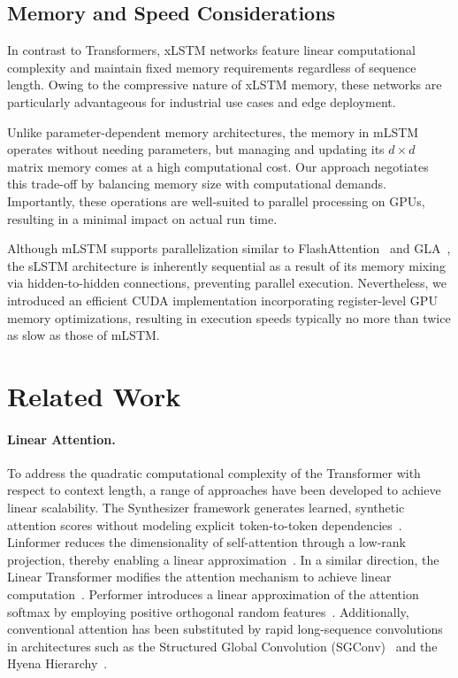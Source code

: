 \subsection{Memory and Speed Considerations}

In contrast to Transformers, xLSTM networks feature linear computational complexity and maintain fixed memory requirements regardless of sequence length. Owing to the compressive nature of xLSTM memory, these networks are particularly advantageous for industrial use cases and edge deployment.

Unlike parameter-dependent memory architectures, the memory in mLSTM operates without needing parameters, but managing and updating its $d \times d$ matrix memory comes at a high computational cost. Our approach negotiates this trade-off by balancing memory size with computational demands. Importantly, these operations are well-suited to parallel processing on GPUs, resulting in a minimal impact on actual run time.

Although mLSTM supports parallelization similar to FlashAttention~\citep{Dao:22,Dao:23} and GLA~\citep{Yang:23arxiv}, the sLSTM architecture is inherently sequential as a result of its memory mixing via hidden-to-hidden connections, preventing parallel execution. Nevertheless, we introduced an efficient CUDA implementation incorporating register-level GPU memory optimizations, resulting in execution speeds typically no more than twice as slow as those of mLSTM.

\section{Related Work}
\label{sec:related}

\paragraph{Linear Attention.} To address the quadratic computational complexity of the Transformer with respect to context length, a range of approaches have been developed to achieve linear scalability. The Synthesizer framework generates learned, synthetic attention scores without modeling explicit token-to-token dependencies~\citep{Tay:20arxiv}. Linformer reduces the dimensionality of self-attention through a low-rank projection, thereby enabling a linear approximation~\citep{Wang:20arxiv}. In a similar direction, the Linear Transformer modifies the attention mechanism to achieve linear computation~\citep{Katharopoulos:20}. Performer introduces a linear approximation of the attention softmax by employing positive orthogonal random features~\citep{Choromanski:21}. Additionally, conventional attention has been substituted by rapid long-sequence convolutions in architectures such as the Structured Global Convolution (SGConv)~\citep{Li:22} and the Hyena Hierarchy~\citep{Poli:23}.

